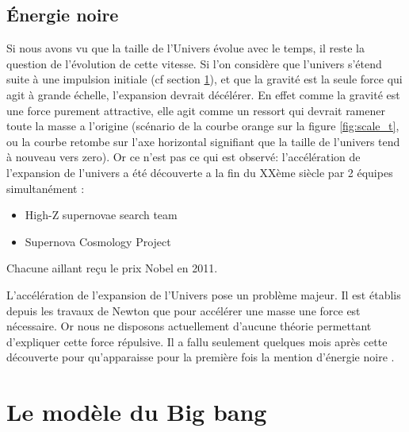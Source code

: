 
\subsection{Énergie noire}
\label{sec:dark_egy}


Si nous avons vu que la taille de l'Univers évolue avec le temps, il reste la question de l’évolution de cette vitesse.
Si l'on considère que l'univers s'étend suite à une impulsion initiale (cf section \ref{sec:BB}), et que la gravité est la seule force qui agit à grande échelle, l'expansion devrait décélérer.
En effet comme la gravité est une force purement attractive, elle agit comme un ressort qui devrait ramener toute la masse a l'origine (scénario de la courbe orange sur la figure \ref{fig:scale_t}, ou la courbe retombe sur l'axe horizontal signifiant que la taille de l'univers tend à nouveau vers zero).
Or ce n'est pas ce qui est observé: l'accélération de l'expansion de l'univers a été découverte a la fin du XXème siècle par 2 équipes simultanément :
\begin{itemize}
\item  High-Z supernovae search team \citep{1998AJ....116.1009R} %
\item  Supernova Cosmology Project \citep{1999ApJ...517..565P} %
\end{itemize}
Chacune aillant reçu le prix Nobel en 2011.

L'accélération de l'expansion de l'Univers pose un problème majeur.
Il est établis depuis les travaux de Newton que pour accélérer une masse une force est nécessaire.
Or nous ne disposons actuellement d'aucune théorie permettant d'expliquer cette force répulsive.
Il a fallu seulement quelques mois après cette découverte pour qu’apparaisse pour la première fois la mention d'énergie noire \citep{1999PhRvD..60h1301H}.


\section{Le modèle du Big bang}
\label{sec:BB}

